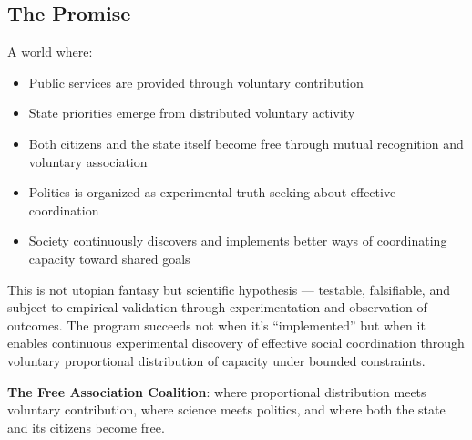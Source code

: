 \documentclass[11pt]{article}
\begin{document}
\subsection{The Promise}

A world where:
\begin{itemize}
\item Public services are provided through voluntary contribution
\item State priorities emerge from distributed voluntary activity
\item Both citizens and the state itself become free through mutual recognition and voluntary association
\item Politics is organized as experimental truth-seeking about effective coordination
\item Society continuously discovers and implements better ways of coordinating capacity toward shared goals
\end{itemize}

This is not utopian fantasy but scientific hypothesis — testable, falsifiable, and subject to empirical validation through experimentation and observation of outcomes. The program succeeds not when it's ``implemented'' but when it enables continuous experimental discovery of effective social coordination through voluntary proportional distribution of capacity under bounded constraints.

\vspace{1em}

\noindent\textbf{The Free Association Coalition}: where proportional distribution meets voluntary contribution, where science meets politics, and where both the state and its citizens become free.
\end{document}
